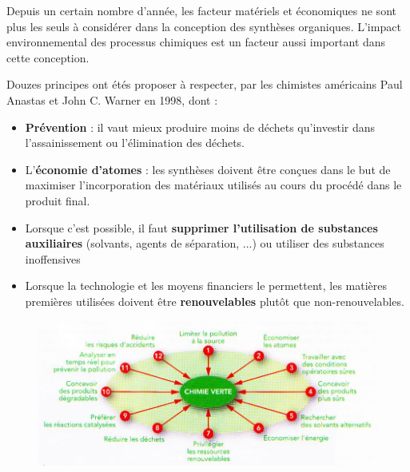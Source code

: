 \documentclass[11pt,a4paper]{article}
\begin{document}
Depuis un certain nombre d'année, les facteur matériels et économiques ne sont plus les seuls à considérer dans la conception des synthèses organiques. L'impact environnemental des processus chimiques est un facteur aussi important dans cette conception. 

Douzes principes ont étés proposer à respecter, par les chimistes américains Paul Anastas et John C. Warner en 1998, dont : 

\begin{itemize}
    \item \textbf{Prévention} : il vaut mieux produire moins de déchets qu'investir dans l'assainissement ou l'élimination des déchets.
    \item L'\textbf{économie d'atomes} : les synthèses doivent être conçues dans le but de maximiser l'incorporation des matériaux utilisés au cours du procédé dans le produit final.
    \item Lorsque c'est possible, il faut \textbf{supprimer l'utilisation de substances auxiliaires} (solvants, agents de séparation, ...) ou utiliser des substances inoffensives
    \item Lorsque la technologie et les moyens financiers le permettent, les matières premières utilisées doivent être \textbf{renouvelables} plutôt que non-renouvelables.
\end{itemize}

\begin{figure}[H]
    \centering
    \includegraphics[width=\linewidth]{imgs/c5/12principes.jpg}
\end{figure} 
\end{document}
